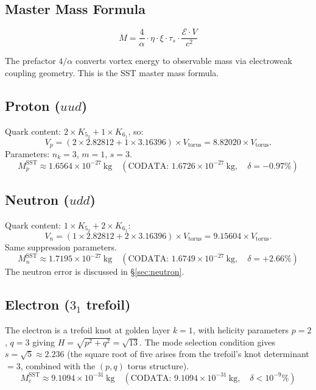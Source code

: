 \documentclass[11pt,a4paper]{article}
\begin{document}
\subsection{Master Mass Formula}

\begin{equation}\label{eq:master}
  \boxed{M = \frac{4}{\alpha}\cdot\eta\cdot\xi\cdot\tau_s
  \cdot\frac{\mathcal{E}\cdot V}{c^2}}
\end{equation}

The prefactor $4/\alpha$ converts vortex energy to observable mass via
electroweak coupling geometry. This is the SST master mass formula.

\subsection{Proton ($uud$)}

Quark content: $2\times K_{5_2} + 1\times K_{6_1}$, so:
\[
  V_p = (2\times 2.82812 + 1\times 3.16396)\times V_\text{torus}
      = 8.82020\times V_\text{torus}.
\]
Parameters: $n_k = 3$, $m = 1$, $s = 3$.
\[
  M_p^\text{SST} \approx 1.6564\times10^{-27}\ \mathrm{kg}
  \quad\left(\text{CODATA: }1.6726\times10^{-27}\ \mathrm{kg},\quad \delta = -0.97\%\right)
\]

\subsection{Neutron ($udd$)}

Quark content: $1\times K_{5_2} + 2\times K_{6_1}$:
\[
  V_n = (1\times 2.82812 + 2\times 3.16396)\times V_\text{torus}
      = 9.15604\times V_\text{torus}.
\]
Same suppression parameters.
\[
  M_n^\text{SST} \approx 1.7195\times10^{-27}\ \mathrm{kg}
  \quad\left(\text{CODATA: }1.6749\times10^{-27}\ \mathrm{kg},\quad \delta = +2.66\%\right)
\]
The neutron error is discussed in \S\ref{sec:neutron}.

\subsection{Electron ($3_1$ trefoil)}

The electron is a trefoil knot at golden layer $k=1$, with helicity parameters
$p=2$, $q=3$ giving $H = \sqrt{p^2+q^2} = \sqrt{13}$. The mode selection
condition gives $s = \sqrt{5} \approx 2.236$ (the square root of five arises from
the trefoil's knot determinant $= 3$, combined with the $(p,q)$ torus structure).
\[
  M_e^\text{SST} \approx 9.1094\times10^{-31}\ \mathrm{kg}
  \quad\left(\text{CODATA: }9.1094\times10^{-31}\ \mathrm{kg},\quad \delta < 10^{-9}\%\right)
\]
\end{document}
